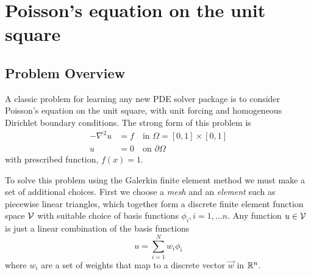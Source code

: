 %
%
%
%
%

\chapter{Poisson's equation on the unit square}
\label{cha:poiss-equat-unit}

\section{Problem Overview}
\label{sec:problem-formulation}

A classic problem for learning any new PDE solver package is to
consider  Poisson's equation on the unit square,  with unit
forcing and homogeneous Dirichlet boundary conditions.  The strong
form of this problem is
\begin{align}
-\nabla^2u &= f \quad\text{in } \Omega=[0,1]\times[0,1]\\
u &= 0 \quad\text{on } \partial\Omega
\end{align}
with  prescribed function, $f(x)=1$. 

To solve this problem using the Galerkin finite element method we must make a set of
additional choices. First we choose a \emph{mesh} and an \emph{element} such as
piecewise linear triangles, which together form a discrete finite
element function space $\mathcal{V}$ with suitable choice of basis
functions $\phi_{i}, i=1,\ldots n$. Any function $u\in\mathcal{V}$ is just a
linear combination of the basis functions
\begin{equation}
  \label{eq:6}
  u = \sum_{i=1}^{N} w_{i}\phi_{i}
\end{equation}
where $w_{i}$ are a set of weights that map to a discrete vector $\vec{w}$ in $\mathbb{R}^n{}$.

